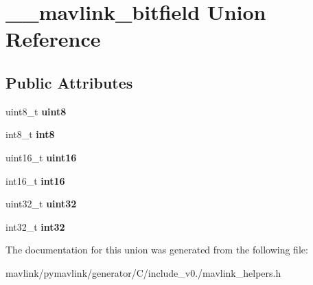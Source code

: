 \hypertarget{union____mavlink__bitfield}{}\section{\+\_\+\+\_\+mavlink\+\_\+bitfield Union Reference}
\label{union____mavlink__bitfield}
\subsection*{Public Attributes}
\begin{DoxyCompactItemize}
\item 
\mbox{\label{union____mavlink__bitfield_ade669a5f63c53f0d61f636eff94417c0}} 
uint8\+\_\+t {\bfseries uint8}
\item 
\mbox{\label{union____mavlink__bitfield_a50a846d427d7a1d7dc79235c87597622}} 
int8\+\_\+t {\bfseries int8}
\item 
\mbox{\label{union____mavlink__bitfield_a0ca76ce4a09ee26387e50b6702c17894}} 
uint16\+\_\+t {\bfseries uint16}
\item 
\mbox{\label{union____mavlink__bitfield_a99cd7f966d8a59b29d05197b39c5b229}} 
int16\+\_\+t {\bfseries int16}
\item 
\mbox{\label{union____mavlink__bitfield_ab43ed56310c2d778ebaa7a5a21cb6587}} 
uint32\+\_\+t {\bfseries uint32}
\item 
\mbox{\label{union____mavlink__bitfield_a07bd702e8b91679a25e632ad90d0a1ec}} 
int32\+\_\+t {\bfseries int32}
\end{DoxyCompactItemize}


The documentation for this union was generated from the following file\+:\begin{DoxyCompactItemize}
\item 
mavlink/pymavlink/generator/\+C/include\+\_\+v0./mavlink\+\_\+helpers.\+h\end{DoxyCompactItemize}
